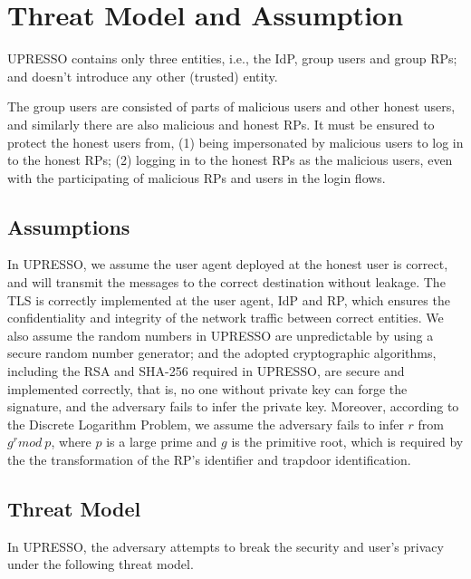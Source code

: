 \section{Threat Model and Assumption}
\label{sec:assumptionandthreatmodel}
UPRESSO contains only three entities, i.e., the IdP, group users and group RPs; and doesn't introduce any other (trusted) entity.

The group users are consisted of parts of malicious users and other honest users, and similarly there are also malicious and honest RPs. It must be ensured to protect the honest users from, (1) being impersonated by malicious users to log in to the honest RPs; (2) logging in to the honest RPs as the malicious users, even with the participating of malicious RPs and users in the login flows. 

\subsection{Assumptions}
In UPRESSO, we assume the user agent deployed at the honest user is correct,
and will transmit the messages to the correct destination without leakage.
The TLS is correctly implemented at the user agent, IdP and RP, which ensures the confidentiality and integrity of the network traffic between correct entities.
We also assume the random numbers in UPRESSO are unpredictable by using  a secure random number generator;
and the adopted cryptographic algorithms, including the RSA and SHA-256 required in UPRESSO, are secure and implemented correctly, that is, no one without private key can forge the signature,
and the adversary fails to infer the private key.
Moreover, according to the Discrete Logarithm Problem,
we assume the adversary fails to infer $r$ from $g^r mod\ p$, where $p$ is a large prime and $g$ is the primitive root, which is required by the the transformation of the RP's identifier and trapdoor identification.

\subsection{Threat Model}
In UPRESSO, the adversary attempts to break the security and user's privacy under the following threat model.

